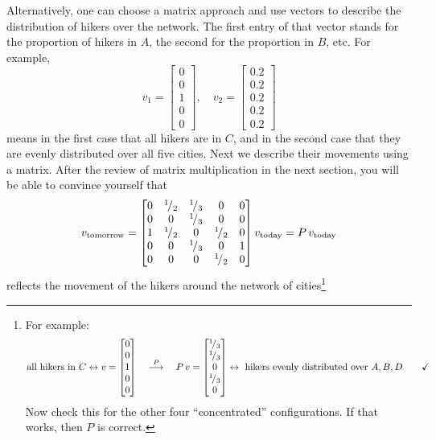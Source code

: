 \begin{application}
Alternatively, one can choose a matrix approach and use vectors to describe the distribution of hikers over the network. The first entry of that vector stands for the proportion of hikers in $A$, the second for the proportion in $B$, etc. For example,
\[ v_1 = \begin{bmatrix} 0 \\ 0 \\ 1 \\ 0 \\ 0 \end{bmatrix}, \quad v_2 = \begin{bmatrix} 0.2 \\ 0.2 \\ 0.2 \\ 0.2 \\ 0.2 \end{bmatrix}\]
means in the first case that all hikers are in $C$, and in the second case that they are evenly distributed over all five cities. Next we describe their movements using a matrix. After the review of matrix multiplication in the next section, you will be able to convince yourself that
\[ v_{\text{tomorrow}} = \begin{bmatrix} 0 & {}^{1}\!/_{2} & {}^{1}\!/_{3} & 0 & 0 \\
									 0 & 0 & {}^{1}\!/_{3} & 0 & 0 \\
									 1 & {}^{1}\!/_{2} & 0 & {}^{1}\!/_{2} & 0 \\
									 0 & 0 & {}^{1}\!/_{3} & 0 & 1 \\
									 0 & 0 & 0 & {}^{1}\!/_{2} & 0 \end{bmatrix} v_{\text{today}}
					   = P \, v_{\text{today}} \]
reflects the movement of the hikers around the network of cities\footnote{For example:
\[ \text{all hikers in $C$} \leftrightarrow
v = \begin{bmatrix} 0 \\ 0 \\ 1 \\ 0 \\ 0 \end{bmatrix}
\quad \stackrel{P}{\longrightarrow} \quad
P \, v = \begin{bmatrix} {}^{1}\!/_{3} \\ {}^{1}\!/_{3} \\ 0 \\ {}^{1}\!/_{3} \\ 0 \end{bmatrix}
\leftrightarrow  \text{ hikers evenly distributed over $A,B,D$}
\qquad \text{\checkmark} \]
Now check this for the other four ``concentrated'' configurations. If that works, then $P$ is correct.
}
\end{application}
